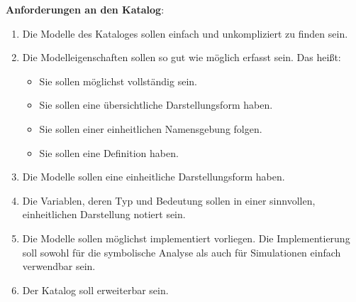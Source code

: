 \textbf{Anforderungen an den Katalog}:
\begin{enumerate}[label=\textbf{Anforderung A.\arabic*}:, ref=\textbf{A.\arabic*}, wide=0pt, leftmargin=*]
	\item \label{A.Findbarkeit}Die Modelle des Kataloges sollen einfach und unkompliziert zu finden sein.
	\item \label{A.Modelleigenschaften}Die Modelleigenschaften sollen so gut wie möglich erfasst sein. Das heißt:
	\begin{itemize}[label=$\bullet$]
		\item Sie sollen möglichst vollständig sein.
		\item Sie sollen eine übersichtliche Darstellungsform haben.
		\item Sie sollen einer einheitlichen Namensgebung folgen.
		\item Sie sollen eine Definition haben.
	\end{itemize}
	\item \label{A.Darstellung_Gleichungen}Die Modelle sollen eine einheitliche Darstellungsform haben.
	\item \label{A.Darstellung_Variablen}Die Variablen, deren Typ und Bedeutung sollen in einer sinnvollen, einheitlichen Darstellung notiert sein.
	\item \label{A.Implementierung}Die Modelle sollen möglichst implementiert vorliegen. Die Implementierung soll sowohl für die symbolische Analyse als auch für Simulationen einfach verwendbar sein.
	\item \label{A.Erweiterbarkeit}Der Katalog soll erweiterbar sein. %
\end{enumerate}

